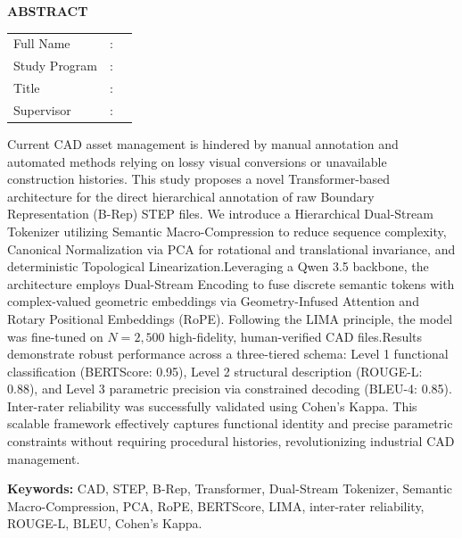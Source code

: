 \begingroup

\begin{center}
	\fontsize{14bp}{1.5\baselineskip}\selectfont \textbf{ABSTRACT}
\end{center}
\vspace{1.5\baselineskip} %

\noindent
\begin{tabular}{@{}p{3.5cm} @{}c@{ } p{10.5cm}@{}}
	Full Name      & : & \AUTHOR \\[8pt]
	Study Program  & : & \STUDYPROGRAM \\[8pt]
	Title          & : & \TITLE \\[8pt]
	Supervisor     & : & \SUPERVISORONE 
\end{tabular}


\noindent Current CAD asset management is hindered by manual annotation and automated methods relying on lossy visual conversions or unavailable construction histories. This study proposes a novel Transformer-based architecture for the direct hierarchical annotation of raw Boundary Representation (B-Rep) STEP files. We introduce a Hierarchical Dual-Stream Tokenizer utilizing Semantic Macro-Compression to reduce sequence complexity, Canonical Normalization via PCA for rotational and translational invariance, and deterministic Topological Linearization.Leveraging a Qwen 3.5 backbone, the architecture employs Dual-Stream Encoding to fuse discrete semantic tokens with complex-valued geometric embeddings via Geometry-Infused Attention and Rotary Positional Embeddings (RoPE). Following the LIMA principle, the model was fine-tuned on $N=2,500$ high-fidelity, human-verified CAD files.Results demonstrate robust performance across a three-tiered schema: Level 1 functional classification (BERTScore: 0.95), Level 2 structural description (ROUGE-L: 0.88), and Level 3 parametric precision via constrained decoding (BLEU-4: 0.85). Inter-rater reliability was successfully validated using Cohen’s Kappa. This scalable framework effectively captures functional identity and precise parametric constraints without requiring procedural histories, revolutionizing industrial CAD management.


\noindent \textbf{Keywords:} CAD, STEP, B-Rep, Transformer, Dual-Stream Tokenizer, Semantic Macro-Compression, PCA, RoPE, BERTScore, LIMA, inter-rater reliability, ROUGE-L, BLEU, Cohen's Kappa.
\endgroup
\pagebreak